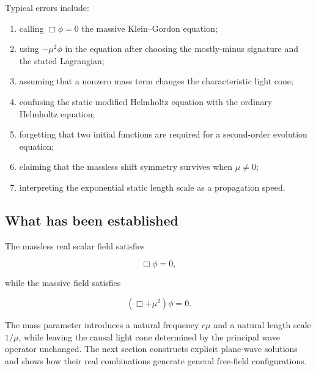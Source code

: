 Typical errors include:

\begin{enumerate}
    \item calling \(\Box\phi=0\) the massive Klein--Gordon equation;
    \item using \(-\mu^{2}\phi\) in the equation after choosing the mostly-minus signature and the stated Lagrangian;
    \item assuming that a nonzero mass term changes the characteristic light cone;
    \item confusing the static modified Helmholtz equation with the ordinary Helmholtz equation;
    \item forgetting that two initial functions are required for a second-order evolution equation;
    \item claiming that the massless shift symmetry survives when \(\mu\neq0\);
    \item interpreting the exponential static length scale as a propagation speed.
\end{enumerate}

\subsection{What has been established}

The massless real scalar field satisfies

\[
\Box\phi=0,
\]

while the massive field satisfies

\[
(\Box+\mu^{2})\phi=0.
\]

The mass parameter introduces a natural frequency \(c\mu\) and a natural length scale \(1/\mu\), while leaving the causal light cone determined by the principal wave operator unchanged. The next section constructs explicit plane-wave solutions and shows how their real combinations generate general free-field configurations.